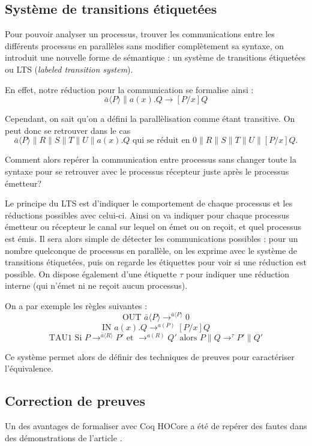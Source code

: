 \documentclass[11pt]{article}
\begin{document}
\subsection{Système de transitions étiquetées} 
Pour pouvoir analyser un processus, trouver les communications entre les différents processus en parallèles sans modifier complètement sa syntaxe, on introduit une nouvelle forme de sémantique : un système de transitions étiquetées ou LTS (\textit{labeled transition system}). 

En effet, notre réduction pour la communication se formalise ainsi :
$$\bar{a}\langle P\rangle\|a(x).Q \rightarrow [P/x]Q$$

Cependant, on sait qu'on a défini la parallèlisation comme étant transitive. On peut donc se retrouver dans le cas
$$\bar{a}\langle P\rangle\|R\|S\|T\|U\|a(x).Q \text{ qui se réduit en } 0\|R\|S\|T\|U\|[P/x]Q.$$

Comment alors repérer la communication entre processus sans changer toute la syntaxe pour se retrouver avec le processus récepteur juste après le processus émetteur?

Le principe du LTS est d'indiquer le comportement de chaque processus et les réductions possibles avec celui-ci. Ainsi on va indiquer pour chaque processus émetteur ou récepteur le canal sur lequel on émet ou on reçoit, et quel processus est émis. Il sera alors simple de détecter les communications possibles : pour un nombre quelconque de processus en parallèle, on les exprime avec le système de transitions étiquetées, puis on regarde les étiquettes pour voir si une réduction est possible. On dispose également d'une étiquette $\tau$ pour indiquer une réduction interne (qui n'émet ni ne reçoit aucun processus).

On a par exemple les règles suivantes : 
$$\text{OUT } \bar{a}\langle P\rangle \rightarrow^{\bar{a}\langle P\rangle} 0$$
$$\text{IN } a(x).Q \rightarrow^{a(P)}[P/x]Q$$
$$\text{TAU1 Si } P\rightarrow^{\bar{a}\langle R\rangle} P' \text{ et } \rightarrow^{a(R)} Q' \text{ alors } P\|Q \rightarrow^{\tau} P'\|Q'$$

Ce système permet alors de définir des techniques de preuves pour caractériser l'équivalence.

\subsection{Correction de preuves}
Un des avantages de formaliser avec Coq HOCore a été de repérer des fautes dans des démonstrations de l'article \cite{expressiveness}.
\end{document}
